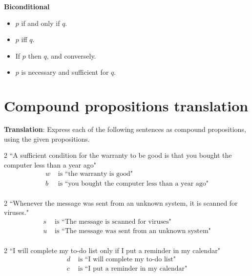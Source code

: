 \documentclass[12pt, oneside]{article}
\begin{document}
{\bf Biconditional}

\vspace{-20pt}
\begin{itemize}
    \item $p$ if and only if $q$.
    \item $p$ iff $q$.
    \item If $p$ then $q$, and conversely.
    \item $p$ is necessary and sufficient for $q$.
\end{itemize} \vfill
\section*{Compound propositions translation}


{\bf Translation}: Express each of the following sentences as compound propositions, using
the given propositions.

\begin{multicols}{2}
``A sufficient condition for the warranty to be good is that you bought the computer less than a year ago"
\columnbreak
\begin{align*}
w &\text{ is  ``the warranty is good"} \\
b &\text{ is  ``you bought the computer less than a year ago"} \\
\end{align*}
\end{multicols}
\vfill

\begin{multicols}{2}
``Whenever the message was sent from an unknown system, it is scanned for viruses."
\columnbreak
\begin{align*}
s &\text{ is  ``The message is scanned for viruses"} \\
u &\text{ is  ``The message was sent from an unknown system"} \\
\end{align*}
\end{multicols}
\vfill

\begin{multicols}{2}
``I will complete my to-do list only if I put a reminder in my calendar"
\columnbreak
\begin{align*}
d &\text{ is  ``I will complete my to-do list"} \\
c &\text{ is  ``I put a reminder in my calendar"} \\
\end{align*}
\end{multicols}
\vfill \vfill
\end{document}
